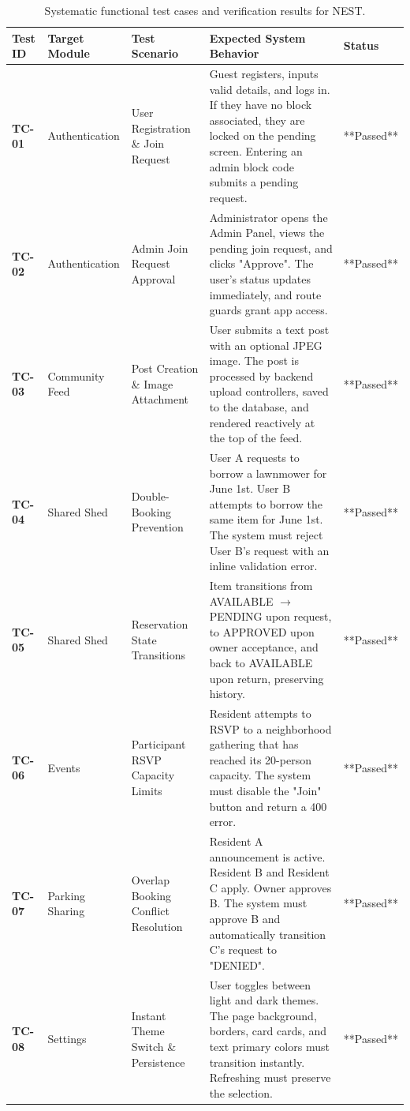 \begin{table}[htbp]
\centering
\scriptsize
\setlength{\tabcolsep}{3pt}
\begin{tabularx}{\textwidth}{|>{\raggedright\arraybackslash}p{1.2cm}|>{\raggedright\arraybackslash}p{2.6cm}|>{\raggedright\arraybackslash}p{2.6cm}|>{\raggedright\arraybackslash}X|p{1.2cm}|}
\hline
\textbf{Test ID} & \textbf{Target Module} & \textbf{Test Scenario} & \textbf{Expected System Behavior} & \textbf{Status} \\ \hline
\textbf{TC-01} & Authentication & User Registration \& Join Request & Guest registers, inputs valid details, and logs in. If they have no block associated, they are locked on the pending screen. Entering an admin block code submits a pending request. & **Passed** \\ \hline
\textbf{TC-02} & Authentication & Admin Join Request Approval & Administrator opens the Admin Panel, views the pending join request, and clicks "Approve". The user's status updates immediately, and route guards grant app access. & **Passed** \\ \hline
\textbf{TC-03} & Community Feed & Post Creation \& Image Attachment & User submits a text post with an optional JPEG image. The post is processed by backend upload controllers, saved to the database, and rendered reactively at the top of the feed. & **Passed** \\ \hline
\textbf{TC-04} & Shared Shed & Double-Booking Prevention & User A requests to borrow a lawnmower for June 1st. User B attempts to borrow the same item for June 1st. The system must reject User B's request with an inline validation error. & **Passed** \\ \hline
\textbf{TC-05} & Shared Shed & Reservation State Transitions & Item transitions from AVAILABLE $\to$ PENDING upon request, to APPROVED upon owner acceptance, and back to AVAILABLE upon return, preserving history. & **Passed** \\ \hline
\textbf{TC-06} & Events & Participant RSVP Capacity Limits & Resident attempts to RSVP to a neighborhood gathering that has reached its 20-person capacity. The system must disable the "Join" button and return a 400 error. & **Passed** \\ \hline
\textbf{TC-07} & Parking Sharing & Overlap Booking Conflict Resolution & Resident A announcement is active. Resident B and Resident C apply. Owner approves B. The system must approve B and automatically transition C's request to "DENIED". & **Passed** \\ \hline
\textbf{TC-08} & Settings & Instant Theme Switch \& Persistence & User toggles between light and dark themes. The page background, borders, card cards, and text primary colors must transition instantly. Refreshing must preserve the selection. & **Passed** \\ \hline
\end{tabularx}
\caption{Systematic functional test cases and verification results for NEST.}
\label{tab:test-cases}
\end{table}

